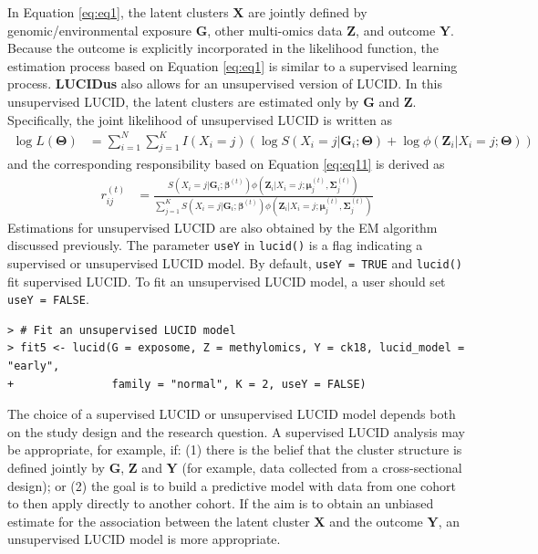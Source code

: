 In Equation \eqref{eq:eq1}, the latent clusters \(\boldsymbol{\mathbf{X}}\)
are jointly defined by genomic/environmental exposure
\(\boldsymbol{\mathbf{G}}\), other multi-omics data
\(\boldsymbol{\mathbf{Z}}\), and outcome \(\boldsymbol{\mathbf{Y}}\).
Because the outcome is explicitly incorporated in the likelihood
function, the estimation process based on Equation \eqref{eq:eq1} is
similar to a supervised learning process. \textbf{LUCIDus} also allows for an
unsupervised version of LUCID. In this unsupervised LUCID, the latent
clusters are estimated only by \(\boldsymbol{\mathbf{G}}\) and
\(\boldsymbol{\mathbf{Z}}\). Specifically, the joint likelihood of
unsupervised LUCID is written as
\[\begin{aligned}
         \log L(\boldsymbol{\mathbf{\Theta}}) & = \sum_{i = 1}^N \sum_{j=1}^K I(X_i = j) \left( \log S(X_i = j| \boldsymbol{\mathbf{G}}_i; \boldsymbol{\mathbf{\Theta}}) + \log \phi(\boldsymbol{\mathbf{Z}}_i| X_i = j; \boldsymbol{\mathbf{\Theta}})\right)
    \end{aligned}
    \label{eq11}   \label{eq:eq11}\]
and the corresponding responsibility based on Equation \eqref{eq:eq11} is
derived as
\[\begin{aligned}
        r_{ij}^{(t)} & = \frac{S\left(X_i = j| \boldsymbol{\mathbf{G}}_i; \boldsymbol{\mathbf{\beta}}^{(t)}\right) \phi\left(\boldsymbol{\mathbf{Z}}_i| X_i = j; \boldsymbol{\mathbf{\mu}}_j^{(t)}, \boldsymbol{\mathbf{\Sigma}}_j^{(t)}\right)}{\sum_{j = 1}^K S\left(X_i = j| \boldsymbol{\mathbf{G}}_i; \boldsymbol{\mathbf{\beta}}^{(t)}\right) \phi\left(\boldsymbol{\mathbf{Z}}_i| X_i = j; \boldsymbol{\mathbf{\mu}}_j^{(t)}, \boldsymbol{\mathbf{\Sigma}}_j^{(t)}\right)}
    \end{aligned}
    \label{eq12}   \label{eq:eq12}\]
Estimations for unsupervised LUCID are also obtained by the EM algorithm
discussed previously. The parameter \texttt{useY} in \texttt{lucid()} is a flag
indicating a supervised or unsupervised LUCID model. By default,
\texttt{useY\ =\ TRUE} and \texttt{lucid()} fit supervised LUCID. To fit an unsupervised
LUCID model, a user should set \texttt{useY\ =\ FALSE}.

\begin{verbatim}
> # Fit an unsupervised LUCID model
> fit5 <- lucid(G = exposome, Z = methylomics, Y = ck18, lucid_model = "early", 
+               family = "normal", K = 2, useY = FALSE)
\end{verbatim}

The choice of a supervised LUCID or unsupervised LUCID model depends
both on the study design and the research question. A supervised LUCID
analysis may be appropriate, for example, if: (1) there is the belief
that the cluster structure is defined jointly by
\(\boldsymbol{\mathbf{G}}\), \(\boldsymbol{\mathbf{Z}}\) and
\(\boldsymbol{\mathbf{Y}}\) (for example, data collected from a
cross-sectional design); or (2) the goal is to build a predictive model
with data from one cohort to then apply directly to another cohort. If
the aim is to obtain an unbiased estimate for the association between
the latent cluster \(\boldsymbol{\mathbf{X}}\) and the outcome
\(\boldsymbol{\mathbf{Y}}\), an unsupervised LUCID model is more
appropriate.

